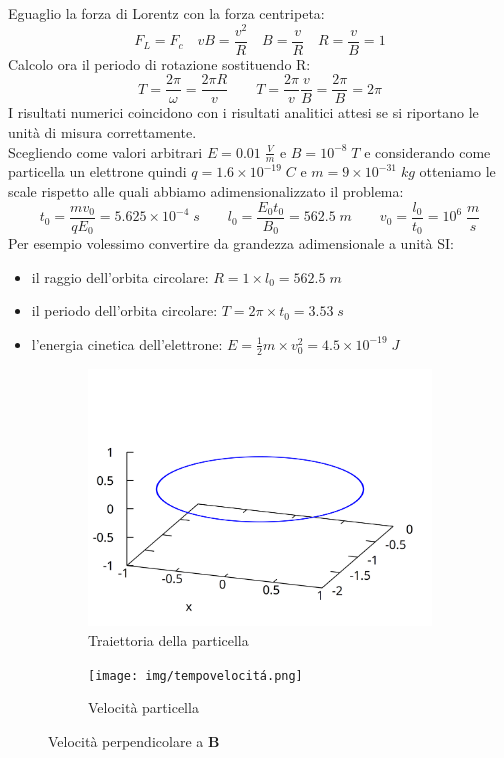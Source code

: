 \documentclass[11pt]{article}
\begin{document}
Eguaglio la forza di Lorentz con la forza centripeta:
\begin{equation}F_L=F_c \quad vB=\frac{v^2}{R} \quad B=\frac{v}{R} \quad R=\frac{v}{B}=1\end{equation}
Calcolo ora il periodo di rotazione sostituendo R:
\begin{equation}T=\frac{2\pi}{\omega}=\frac{2\pi R}{v} \qquad T=\frac{2\pi}{v}\frac{v}{B} = \frac{2\pi}{B} = 2\pi\end{equation}
I risultati numerici coincidono con i risultati analitici attesi se si riportano le unit\`a di misura correttamente. \\
Scegliendo come valori arbitrari $E = 0.01 \; \frac{V}{m}$ e $B = 10^{-8} \; T $ e considerando come particella un elettrone quindi  $q = 1.6 \times 10^{-19} \;C $ e $m = 9 \times 10^{-31} \; kg$ otteniamo le scale rispetto alle quali abbiamo adimensionalizzato il problema:
 \begin{equation}t_0 = \frac{m  v_0}  {q  E_0} =  5.625 \times 10^{-4} \; s  \qquad l_0 = \frac{E_0t_0}{B_0} = 562.5 \; m  \qquad v_0 = \frac{l_0}{t_0} = 10^6 \; \frac{m}{s}\end{equation}
Per esempio volessimo convertire da grandezza adimensionale a unit\`a SI:
\begin{itemize}
\item il raggio dell'orbita circolare: $R = 1 \times l_0 = 562.5 \; m $
\item il periodo dell'orbita circolare: $T = 2\pi \times t_0 = 3.53 \; s $
\item l'energia cinetica dell'elettrone: $ E = \frac{1}{2}m \times v_0^2 = 4.5 \times 10^{-19} \;J$
\end{itemize}

\begin{figure}[ht]
\begin{subfigure}{.5\textwidth}
  \centering
  \includegraphics[width=.9\linewidth]{img/3dposizione.png}  
  \caption{Traiettoria della particella}
\end{subfigure}
\begin{subfigure}{.5\textwidth}
  \centering
  \texttt{[image: img/tempovelocitá.png]}  
  \caption{Velocit\`a particella}
\end{subfigure}
\caption{Velocit\`a perpendicolare a $\mathbf{B}$}
\end{figure}
\end{document}
